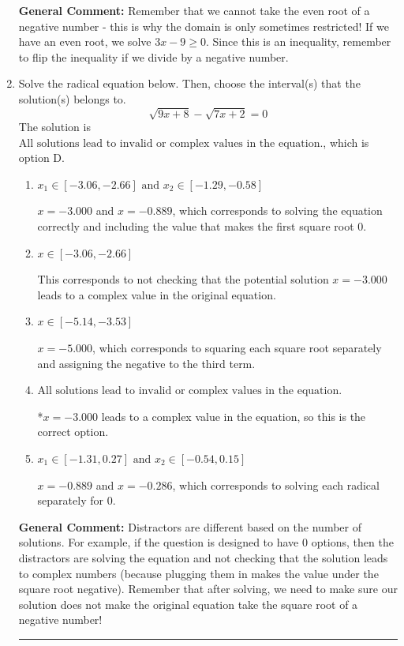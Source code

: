 \documentclass{extbook}[14pt]
\newcommand{\litem}[1]{\item #1

\rule{\textwidth}{0.4pt}}
\begin{document}
\begin{enumerate}
{\textbf{General Comment:} Remember that we cannot take the even root of a negative number - this is why the domain is only sometimes restricted! If we have an even root, we solve $3 x - 9 \geq 0$. Since this is an inequality, remember to flip the inequality if we divide by a negative number.
}
\litem{
Solve the radical equation below. Then, choose the interval(s) that the solution(s) belongs to.
\[ \sqrt{9 x + 8} - \sqrt{7 x + 2} = 0 \]The solution is \( \text{All solutions lead to invalid or complex values in the equation.} \), which is option D.\begin{enumerate}[label=\Alph*.]
\item \( x_1 \in [-3.06, -2.66] \text{ and } x_2 \in [-1.29,-0.58] \)

$x = -3.000$ and $x = -0.889$, which corresponds to solving the equation correctly and including the value that makes the first square root 0.
\item \( x \in [-3.06,-2.66] \)

This corresponds to not checking that the potential solution $x = -3.000$ leads to a complex value in the original equation.
\item \( x \in [-5.14,-3.53] \)

$x = -5.000$, which corresponds to squaring each square root separately and assigning the negative to the third term.
\item \( \text{All solutions lead to invalid or complex values in the equation.} \)

*$x = -3.000$ leads to a complex value in the equation, so this is the correct option.
\item \( x_1 \in [-1.31, 0.27] \text{ and } x_2 \in [-0.54,0.15] \)

$x = -0.889$ and $x = -0.286$, which corresponds to solving each radical separately for 0.
\end{enumerate}

\textbf{General Comment:} Distractors are different based on the number of solutions. For example, if the question is designed to have 0 options, then the distractors are solving the equation and not checking that the solution leads to complex numbers (because plugging them in makes the value under the square root negative). Remember that after solving, we need to make sure our solution does not make the original equation take the square root of a negative number!
}
\end{enumerate}
\end{document}
